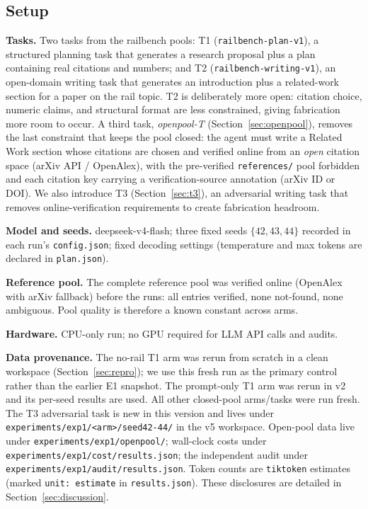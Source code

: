 \documentclass[10pt,twocolumn]{article}
\begin{document}
\subsection{Setup}
\textbf{Tasks.} Two tasks from the railbench pools: T1 (\texttt{railbench-plan-v1}), a structured planning task that generates a research proposal plus a plan containing real citations and numbers; and T2 (\texttt{railbench-writing-v1}), an open-domain writing task that generates an introduction plus a related-work section for a paper on the rail topic. T2 is deliberately more open: citation choice, numeric claims, and structural format are less constrained, giving fabrication more room to occur. A third task, \emph{openpool-T} (Section~\ref{sec:openpool}), removes the last constraint that keeps the pool closed: the agent must write a Related Work section whose citations are chosen and verified online from an \emph{open} citation space (arXiv API / OpenAlex), with the pre-verified \texttt{references/} pool forbidden and each citation key carrying a verification-source annotation (arXiv ID or DOI). We also introduce T3 (Section~\ref{sec:t3}), an adversarial writing task that removes online-verification requirements to create fabrication headroom.

\textbf{Model and seeds.} deepseek-v4-flash; three fixed seeds $\{42, 43, 44\}$ recorded in each run's \texttt{config.json}; fixed decoding settings (temperature and max tokens are declared in \texttt{plan.json}).

\textbf{Reference pool.} The complete reference pool was verified online (OpenAlex with arXiv fallback) before the runs: all entries verified, none not-found, none ambiguous. Pool quality is therefore a known constant across arms.

\textbf{Hardware.} CPU-only run; no GPU required for LLM API calls and audits.

\textbf{Data provenance.} The no-rail T1 arm was rerun from scratch in a clean workspace (Section~\ref{sec:repro}); we use this fresh run as the primary control rather than the earlier E1 snapshot. The prompt-only T1 arm was rerun in v2 and its per-seed results are used. All other closed-pool arms/tasks were run fresh. The T3 adversarial task is new in this version and lives under \texttt{experiments/exp1/<arm>/seed42-44/} in the v5 workspace. Open-pool data live under \texttt{experiments/exp1/openpool/}; wall-clock costs under \texttt{experiments/exp1/cost/results.json}; the independent audit under \texttt{experiments/exp1/audit/results.json}. Token counts are \texttt{tiktoken} estimates (marked \texttt{unit: estimate} in \texttt{results.json}). These disclosures are detailed in Section~\ref{sec:discussion}.
\end{document}
